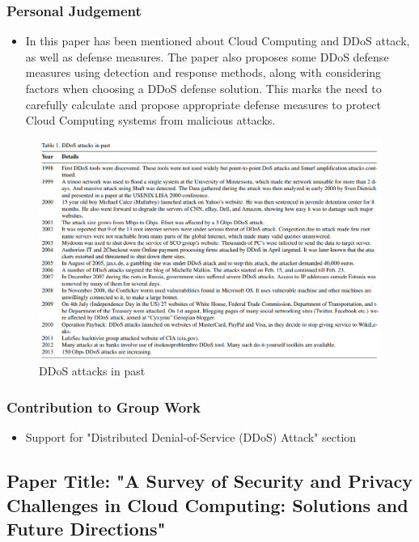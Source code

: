 \documentclass[12pt, twoside]{article}
\begin{document}
\subsubsection{Personal Judgement}
\begin{itemize}
\item In this paper has been mentioned about Cloud Computing and DDoS attack, as well as defense measures. The paper also proposes some DDoS defense measures using detection and response methods, along with considering factors when choosing a DDoS defense solution. This marks the need to carefully calculate and propose appropriate defense measures to protect Cloud Computing systems from malicious attacks.
\end{itemize}

\begin{figure}[H]
\centering
\includegraphics[scale = 0.5]{DDoS.png}
\caption{DDoS attacks in past}
\end{figure}

\subsubsection{Contribution to Group Work}
\begin{itemize}
\item Support for "Distributed Denial-of-Service (DDoS) Attack" section
\end{itemize}
\subsection{Paper Title: "A Survey of Security and Privacy Challenges in Cloud Computing: Solutions and Future Directions" \cite{liu2015survey}}
\end{document}
